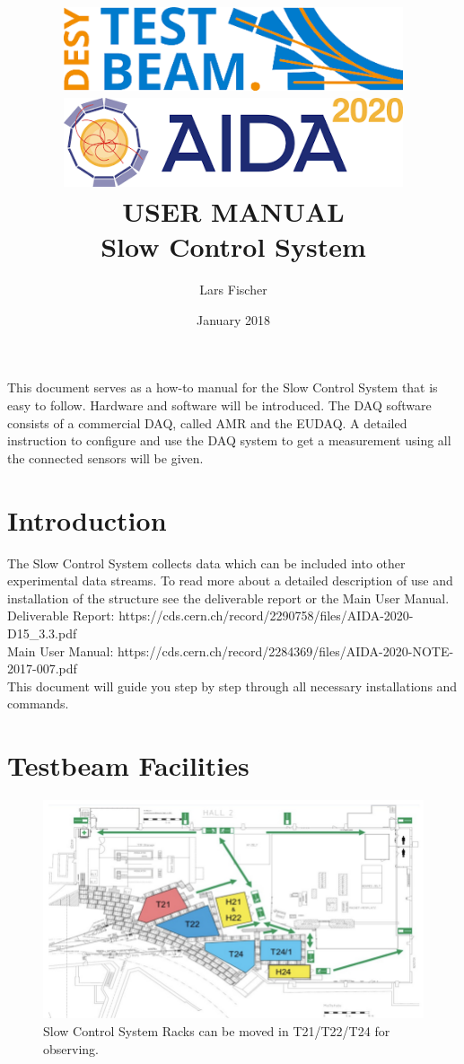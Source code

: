\documentclass[a4paper,12pt]{scrartcl}
\title{\includegraphics[width=10cm]{DESYTestBeam.png}  \includegraphics[width=10cm]{Aida2020.png} \\ \vspace{2cm} USER MANUAL \\ Slow Control System}
\author[*]{Lars Fischer}
\affil[*]{Deutsches Elektronen-Synchrotron DESY, Notkestr. 85, 22607 Hamburg, Germany}
\date{January 2018}
\begin{document}
\maketitle
This document serves as a how-to manual for the Slow Control System that is easy to follow. Hardware and software will be introduced. The DAQ software consists of a commercial DAQ, called AMR and the EUDAQ. A detailed instruction to configure and use the DAQ system to get a measurement using all the connected sensors will be given.
\pagebreak

\tableofcontents
\pagebreak

\section{Introduction}
The Slow Control System collects data which can be included into other experimental data streams. To read more about a detailed description of use and installation of the structure see the deliverable report or the Main User Manual. \\
Deliverable Report: https://cds.cern.ch/record/2290758/files/AIDA-2020-D15\_3.3.pdf \\
Main User Manual: https://cds.cern.ch/record/2284369/files/AIDA-2020-NOTE-2017-007.pdf \\
This document will guide you step by step through all necessary installations and commands.

\section{Testbeam Facilities}
\begin{figure} [H]
\centering
\includegraphics[width=\textwidth]{Testbeam.png}
\caption{Slow Control System Racks can be moved in T21/T22/T24 for observing.}
\end{figure}
\end{document}
